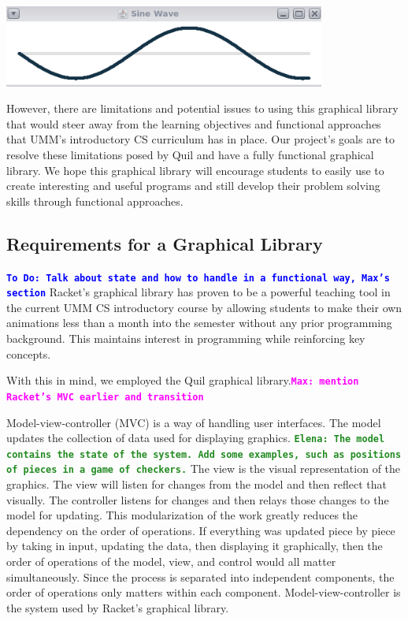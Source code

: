 \documentclass[12pt]{article}
\newcommand{\comment}[1]{{\bf \tt  {#1}}}
\newcommand{\emcomment}[1]{\textcolor{ForestGreen}{\comment{Elena: {#1}}}}
\newcommand{\todo}[1]{\textcolor{blue}{\comment{To Do: {#1}}}}
\newcommand{\mmcomment}[1]{\textcolor{magenta}{\comment{Max: {#1}}}}
\begin{document}
\begin{center}
\includegraphics[width=300pt]{sine-wave}
\end{center}

However, there are limitations and potential issues to using this graphical library that would steer away from the learning objectives and functional approaches that UMM's introductory CS curriculum has in place. Our project's goals are to resolve these limitations posed by Quil and have a fully functional graphical library. We hope this graphical library will encourage students to easily use to create interesting and useful programs and still develop their problem solving skills through functional approaches.


\subsection{Requirements for a Graphical Library}\label{subsec:requirements}
\todo{Talk about state and how to handle in a functional way, Max's section}
Racket's graphical library has proven to be a powerful teaching tool in the current UMM CS introductory course by allowing students to make their own animations less than a month into the semester without any prior programming background. This maintains interest in programming while reinforcing key concepts. 

With this in mind, we employed the Quil graphical library.\mmcomment{mention Racket's MVC earlier and transition}

Model-view-controller (MVC) is a way of handling user interfaces. The model updates the collection of data used for displaying graphics. 
\emcomment{The model contains the state of the system. Add some examples, such as positions of pieces in a game of checkers.}
The view is the 
visual representation of the graphics. The view will listen for changes from the model and then reflect that visually. The controller listens for changes and then relays those changes to the model for updating. This modularization of the work greatly reduces the dependency on the order of operations. If everything was updated piece by piece by taking in input, updating the data, then displaying it graphically, then the order of operations of the model, view, and control would all matter simultaneously. Since the process is separated into independent components, the order of operations only matters within each component. Model-view-controller is the system used by Racket's graphical library.
\end{document}
